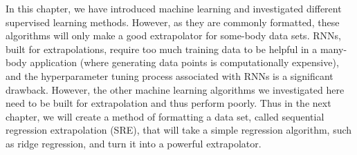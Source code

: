 In this chapter, we have introduced machine learning and investigated different supervised learning methods. However, as they are commonly formatted, these algorithms will only make a good extrapolator for some-body data sets. RNNs, built for extrapolations, require too much training data to be helpful in a many-body application (where generating data points is computationally expensive), and the hyperparameter tuning process associated with RNNs is a significant drawback. However, the other machine learning algorithms we investigated here need to be built for extrapolation and thus perform poorly. Thus in the next chapter, we will create a method of formatting a data set, called sequential regression extrapolation (SRE), that will take a simple regression algorithm, such as ridge regression, and turn it into a powerful extrapolator. 